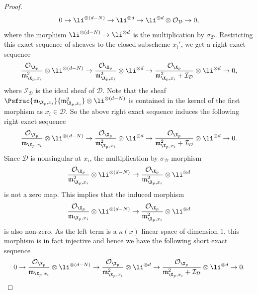 \begin{proof}
\[
0\to \li^{\otimes (d-N)} \to \li^{\otimes d} \to \li^{\otimes d}\otimes \mathcal{O}_{\mathcal{D}}\to 0,
\]
where the morphism $\li^{\otimes (d-N)} \to \li^{\otimes d}$ is the multiplication by $\sigma_{\mathcal{D}}$. Restricting this exact sequence of sheaves to the closed subscheme $x_i'$, we get a right exact sequence\vspace*{-3pt}
\[
\frac{\mathcal{O}_{\X_p}}{\mathfrak{m}_{\X_p, x_i}^2}\otimes \li^{\otimes (d-N)} \to \frac{\mathcal{O}_{\X_p}}{\mathfrak{m}_{\X_p, x_i}^2}\otimes \li^{\otimes d}\to \frac{\mathcal{O}_{\X_p}}{\mathfrak{m}^2_{\X_p, x_i}+\mathcal{I}_{\mathcal{D}}}\otimes \li^{\otimes d}\to 0,
\]
where $\mathcal{I}_{\mathcal{D}}$ is the ideal sheaf of $\mathcal{D}$. Note that the sheaf $\Psfrac{\mathfrak{m}_{\X_p, x_i}}{\mathfrak{m}_{\X_p, x_i}^2}\otimes \li^{\otimes (d-N)}$ is contained in the kernel of the first morphism as $x_i\in \mathcal{D}$. So the above right exact sequence induces the following right exact sequence\vspace*{-3pt}
\[
\frac{\mathcal{O}_{\X_p}}{\mathfrak{m}_{\X_p, x_i}}\otimes \li^{\otimes (d-N)} \to \frac{\mathcal{O}_{\X_p}}{\mathfrak{m}_{\X_p, x_i}^2}\otimes \li^{\otimes d}\to \frac{\mathcal{O}_{\X_p}}{\mathfrak{m}^2_{\X_p, x_i}+\mathcal{I}_{\mathcal{D}}}\otimes \li^{\otimes d}\to 0.
\]
Since $\mathcal{D}$ is nonsingular at $x_i$, the multiplication by $\sigma_{\mathcal{D}}$ morphism\vspace*{-3pt}
\[
\frac{\mathcal{O}_{\X_p}}{\mathfrak{m}_{\X_p, x_i}^2}\otimes \li^{\otimes (d-N)} \to \frac{\mathcal{O}_{\X_p}}{\mathfrak{m}_{\X_p, x_i}^2}\otimes \li^{\otimes d}
\]
is not a zero map. This implies that the induced morphism\vspace*{-3pt}
\[
\frac{\mathcal{O}_{\X_p}}{\mathfrak{m}_{\X_p, x_i}}\otimes \li^{\otimes (d-N)} \to \frac{\mathcal{O}_{\X_p}}{\mathfrak{m}_{\X_p, x_i}^2}\otimes \li^{\otimes d}
\]
is also non-zero.
As the left term is a $\kappa(x)$ linear space of dimension $1$, this morphism is in fact injective and hence we have the following short exact sequence\vspace*{-3pt}
\[
0\to \frac{\mathcal{O}_{\X_p}}{\mathfrak{m}_{\X_p, x_i}}\otimes \li^{\otimes (d-N)} \to \frac{\mathcal{O}_{\X_p}}{\mathfrak{m}_{\X_p, x_i}^2}\otimes \li^{\otimes d}\to \frac{\mathcal{O}_{\X_p}}{\mathfrak{m}^2_{\X_p, x_i}+\mathcal{I}_{\mathcal{D}}}\otimes \li^{\otimes d}\to 0.
\]


\end{proof}
